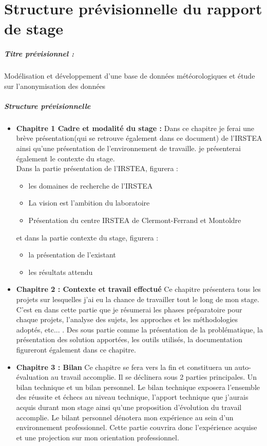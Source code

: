 \chapter{Structure prévisionnelle du rapport de stage}
\paragraph{Titre prévisionnel : }
Modélisation et développement d'une base de données météorologiques et étude sur l'anonymisation des données

\paragraph{Structure prévisionnelle}
\begin{itemize}
    

\item {\textbf{Chapitre 1  Cadre et modalité du stage : }}
Dans ce chapitre je ferai une brève présentation(qui se retrouve également dans ce document) de l'IRSTEA ainsi qu'une présentation de l'environnement de travaille. je présenterai également le contexte du stage.
\\
Dans la partie présentation de l'IRSTEA, figurera  : 
\begin{itemize}
 \item les domaines de recherche de l'IRSTEA
 \item La vision est l'ambition du laboratoire
 \item Présentation du centre IRSTEA de Clermont-Ferrand et Montoldre
 \end{itemize}
et dans la partie contexte du stage, figurera : 
\begin{itemize}
    \item la présentation de l'existant
    \item les résultats attendu
\end{itemize}

\item {\textbf{Chapitre 2 : Contexte et travail effectué}}
Ce chapitre présentera tous les projets sur lesquelles j'ai eu la chance de travailler tout le long de mon stage.
C'est en dans cette partie que je résumerai les phases préparatoire pour chaque projets, l'analyse des sujets, les approches et les méthodologies adoptés, etc... . Des sous partie comme la présentation de la problématique, la présentation des solution apportées, les outils utilisés, la documentation figureront également dans ce chapitre.

\item {\textbf{Chapitre 3 : Bilan}}
Ce chapitre se fera vers la fin et constituera un auto-évaluation au travail accomplie. Il se déclinera sous 2 parties principales. Un bilan technique et un bilan personnel. Le bilan technique exposera l'ensemble des réussite et échecs au niveau technique, l'apport technique que j'aurais acquis durant mon stage ainsi qu'une proposition d'évolution du travail accomplie. Le bilant personnel dénotera mon expérience au sein d'un environnement professionnel. Cette partie couvrira donc  l'expérience acquise et une projection sur mon orientation professionnel.
\end{itemize}






